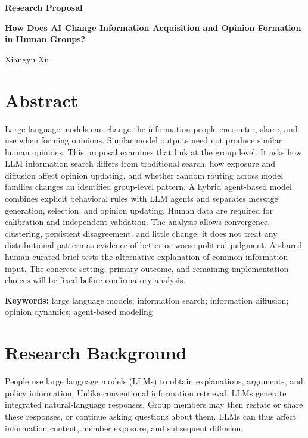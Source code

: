 \documentclass[11pt,a4paper]{article}
\begin{document}
\begin{titlepage}
\centering
\vspace*{2.5cm}
{\sffamily\bfseries\color{navy}\LARGE Research Proposal\par}
\vspace{1.2cm}
{\sffamily\bfseries\Huge How Does AI Change Information Acquisition and Opinion Formation in Human Groups?\par}
\vspace{1.5cm}
{\sffamily\Large Xiangyu Xu\par}
\vspace{0.8cm}

\vfill
\end{titlepage}

\section*{Abstract}

Large language models can change the information people encounter, share, and use when forming opinions. Similar model outputs need not produce similar human opinions. This proposal examines that link at the group level. It asks how LLM information search differs from traditional search, how exposure and diffusion affect opinion updating, and whether random routing across model families changes an identified group-level pattern. A hybrid agent-based model combines explicit behavioral rules with LLM agents and separates message generation, selection, and opinion updating. Human data are required for calibration and independent validation. The analysis allows convergence, clustering, persistent disagreement, and little change; it does not treat any distributional pattern as evidence of better or worse political judgment. A shared human-curated brief tests the alternative explanation of common information input. The concrete setting, primary outcome, and remaining implementation choices will be fixed before confirmatory analysis.

\textbf{Keywords:} large language models; information search; information diffusion; opinion dynamics; agent-based modeling

\section{Research Background}

People use large language models (LLMs) to obtain explanations, arguments, and policy information. Unlike conventional information retrieval, LLMs generate integrated natural-language responses. Group members may then restate or share these responses, or continue asking questions about them. LLMs can thus affect information content, member exposure, and subsequent diffusion.
\end{document}
